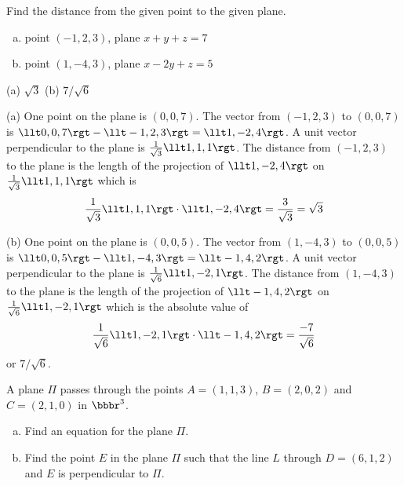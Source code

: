 \begin{question}
Find the distance from the given point to the given plane.
\begin{enumerate}[(a)]
\item
point $(-1,2,3)$, plane $x+y+z=7$
\item
point $(1,-4,3)$, plane $x-2y+z=5$ 
\end{enumerate}
\end{question}

%

\begin{answer}
(a) $\sqrt{3}$\qquad
(b) $7/\sqrt{6}$
\end{answer}

\begin{solution}
(a) One point on the plane is $(0,0,7)$. The vector from $(-1,2,3)$
to $(0,0,7)$ is $\llt 0,0,7\rgt -\llt -1,2,3\rgt =\llt 1,-2,4\rgt $. 
A unit vector perpendicular to the plane is 
$\frac{1}{\sqrt{3}}\llt 1,1,1\rgt $. The distance from  
$(-1,2,3)$ to the plane is the length of the projection of 
$\llt 1,-2,4\rgt $ on $\frac{1}{\sqrt{3}}\llt 1,1,1\rgt $ which is \begin{align*}
\frac{1}{\sqrt{3}}\llt 1,1,1\rgt \cdot\llt 1,-2,4\rgt 
=\frac{3}{\sqrt{3}}
=\sqrt{3}
\end{align*}

(b) One point on the plane is $(0,0,5)$. The vector from 
$(1,-4,3)$ to $(0,0,5)$ is $\llt 0,0,5\rgt -\llt 1,-4,3\rgt =\llt -1,4,2\rgt$. A unit vector perpendicular to the plane is 
$\frac{1}{\sqrt{6}}\llt 1,-2,1\rgt $. The distance from  
$(1,-4,3)$ to the plane is the length of the projection of 
$\llt -1,4,2\rgt $ on $\frac{1}{\sqrt{6}}\llt 1,-2,1\rgt $ which is 
the absolute value of 
\begin{equation*}
\frac{1}{\sqrt{6}}\llt 1,-2,1\rgt \cdot \llt -1,4,2\rgt 
=\frac{-7}{\sqrt{6}}
\end{equation*}
or $7/\sqrt{6}$.
\end{solution}



\begin{question}[M200 2007A] %
A plane $\Pi$ passes through the points $A = (1, 1, 3)$, $B = (2, 0, 2)$ 
and $C = (2, 1, 0)$ in $\bbbr^3$.
\begin{enumerate}[(a)]
\item
 Find an equation for the plane $\Pi$.
\item
 Find the point $E$ in the plane $\Pi$ such that the line $L$ through 
$D = (6, 1, 2)$ and $E$ is perpendicular to $\Pi$.
\end{enumerate}
\end{question}

